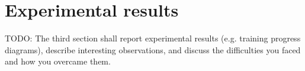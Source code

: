 \section{Experimental results} \label{experimental_setup}

TODO: The third section shall report experimental results
(e.g. training progress diagrams), describe interesting observations, and discuss the difficulties you faced and how you overcame them.
